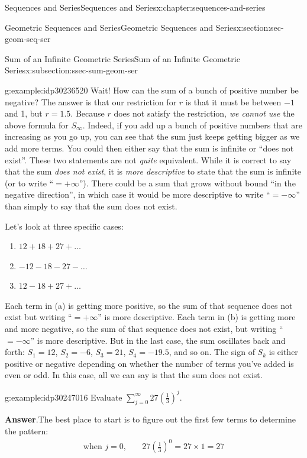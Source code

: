 \documentclass[twoside,10pt,]{book}
\newcommand{\blocktitlefont}{\relax}
\numberwithin{equation}{section}
\newcommand{\amp}{&}
\begin{document}
\begin{chapterptx}{Sequences and Series}{}{Sequences and Series}{}{}{x:chapter:sequences-and-series}
\begin{sectionptx}{Geometric Sequences and Series}{}{Geometric Sequences and Series}{}{}{x:section:sec-geom-seq-ser}
\begin{subsectionptx}{Sum of an Infinite Geometric Series}{}{Sum of an Infinite Geometric Series}{}{}{x:subsection:ssec-sum-geom-ser}
\begin{example}{}{g:example:idp30236520}
Wait!  How can the sum of a bunch of positive number be negative?  The answer is that our restriction for \(r\) is that it must be between \(-1\) and 1, but \(r = 1.5\).  Because \(r\) does not satisfy the restriction, \emph{we cannot use} the above formula for \(S_\infty\).  Indeed, if you add up a bunch of positive numbers that are increasing as you go up, you can see that the sum just keeps getting bigger as we add more terms.  You could then either say that the sum is infinite or ``does not exist''.  These two statements are not \emph{quite} equivalent.  While it is correct to say that the sum \emph{does not exist}, it is \emph{more descriptive} to state that the sum is infinite (or to write ``\(=+\infty\)'').  There could be a sum that grows without bound ``in the negative direction'', in which case it would be more descriptive to write ``\(=-\infty\)'' than simply to say that the sum does not exist.\end{example}
%
\par
Let's look at three specific cases:%
\begin{enumerate}[label=(\alph*)]
\item{}\(\displaystyle 12+18+27+\ldots\)%
\item{}\(\displaystyle -12-18-27-\ldots\)%
\item{}\(\displaystyle 12-18+27+\ldots\)%
\end{enumerate}
Each term in (a) is getting more positive, so the sum of that sequence does not exist but writing ``\(=+\infty\)'' is more descriptive.  Each term in (b) is getting more and more negative, so the sum of that sequence does not exist, but writing ``\(=-\infty\)'' is more descriptive.  But in the last case, the sum oscillates back and forth:  \(S_1 = 12\), \(S_2 = -6\), \(S_3 = 21\), \(S_4 = -19.5\), and so on.  The sign of \(S_k\) is either positive or negative depending on whether the number of terms you've added is even or odd.  In this case, all we can say is that the sum does not exist. \begin{example}{}{g:example:idp30247016}%
Evaluate \(\sum\limits_{j = 0}^\infty  {27{{\left( {\frac{1}{3}} \right)}^j}}\).\par\smallskip%
\noindent\textbf{\blocktitlefont Answer}.\label{g:answer:idp30247272}{}\hypertarget{g:answer:idp30247272}{}\quad{}The best place to start is to figure out the first few terms to determine the pattern:%
\begin{align*}
\text{when } j = 0,\quad \amp 27{\left( {\frac{1}{3}} \right)^0} = 27 \times 1 = 27\\

\end{align*}
\end{example}
\end{subsectionptx}
\end{sectionptx}
\end{chapterptx}
\end{document}
